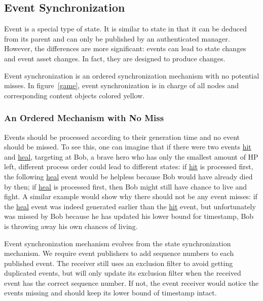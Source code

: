 \documentclass{sigchi}
\begin{document}
\subsection{Event Synchronization}
\label{eventsync}
Event is a special type of state. It is similar to state in that it can be deduced from its parent and can only be published by an authenticated manager. %
However, the differences are more significant: events can lead to state changes and event asset changes. In fact, they are designed to produce changes.

Event synchronization is an ordered synchronization mechanism with no potential misses. In figure~\ref{game}, event synchronization is in charge of all nodes and corresponding content objects colored yellow.


\subsubsection{An Ordered Mechanism with No Miss}
Events should be processed according to their generation time and no event should be missed. To see this, one can imagine that if there were two events \url{hit} and \url{heal}, targeting at Bob, a brave hero who has only the smallest amount of HP left, different process order could lead to different states: if \url{hit} is processed first, the following \url{heal} event would be helpless because Bob would have already died by then; if \url{heal} is processed first, then Bob might still have chance to live and fight. A similar example would show why there should not be any event misses: if the \url{heal} event was indeed generated earlier than the \url{hit} event, but unfortunately was missed by Bob because he has updated his lower bound for timestamp, Bob is throwing away his own chances of living.


Event synchronization mechanism evolves from the state synchronization mechanism. We require event publishers to add sequence numbers to each published event. The receiver still uses an exclusion filter to avoid getting duplicated events, but will only update its exclusion filter when the received event has the correct sequence number. If not, the event receiver would notice the events missing and should keep its lower bound of timestamp intact.
\end{document}
